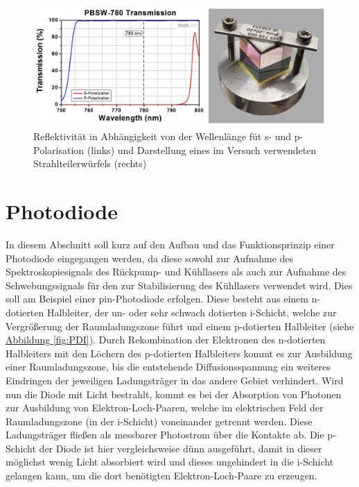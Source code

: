 \documentclass[
class=book,
accentcolor=1b,
custommargins=geometry,
fontsize=11pt,
thesis={type=Versuchsanleitung},
ruledheaders=all,
headline=false,
instbox=false,
marginpar=false,
title=small,
ignore-missing-data=true,
twoside=false,
logofile=apqdesign/tuda_logo.pdf,
pdfa=false %
]{apqpub}
\newtheorem{frage}[satz]{Frage}
\begin{document}
		\\
			
			\begin{figure}[htb!]
				\centering
				\includegraphics[width=\textwidth]{graphics/DP.jpg}
				\caption{Reflektivität in Abhängigkeit von der Wellenlänge füt s- und p-Polarisation (links)\cite{POL}
				und Darstellung eines im Versuch verwendeten Strahlteilerwürfels (rechts)}
				\label{fig:PST}
			\end{figure}

			\section{Photodiode}
			In diesem Abschnitt soll kurz auf den Aufbau und das Funktionsprinzip einer Photodiode eingegangen werden, da diese sowohl zur Aufnahme des Spektroskopiesignals des Rückpump- und Kühllasers als auch zur Aufnahme des Schwebungssignals für den  zur Stabilisierung des Kühllasers verwendet wird.
			Dies soll am Beispiel einer pin-Photodiode erfolgen. 
			Diese besteht aus einem n-dotierten Halbleiter, der un- oder sehr schwach dotierten i-Schicht, welche zur Vergrößerung der Raumladungszone führt und einem p-dotierten Halbleiter (siehe \hyperref[fig:PDI]{Abbildung \ref{fig:PDI}}). 
			Durch Rekombination der Elektronen des n-dotierten Halbleiters mit den Löchern des p-dotierten Halbleiters kommt es zur Ausbildung einer Raumladungszone, bis die entstehende Diffusionsspannung ein weiteres Eindringen der jeweiligen Ladungsträger in das andere Gebiet verhindert. 
			Wird nun die Diode mit Licht bestrahlt, kommt es bei der Absorption von Photonen zur Ausbildung von Elektron-Loch-Paaren, welche im elektrischen Feld der Raumladungszone (in der i-Schicht) voneinander getrennt werden. Diese Ladungsträger fließen als messbarer Photostrom über die Kontakte ab.
			Die p-Schicht der Diode ist hier vergleichsweise dünn ausgeführt, damit in dieser möglichst wenig Licht absorbiert wird und dieses ungehindert in die i-Schicht gelangen kann, um die dort benötigten Elektron-Loch-Paare zu erzeugen.
			
\end{document}
